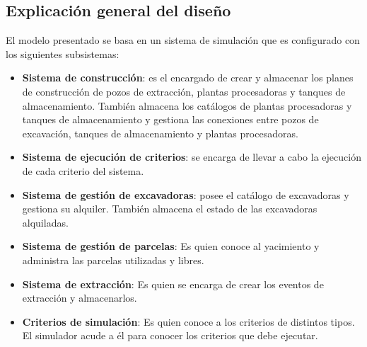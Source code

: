 \subsection{Explicación general del diseño}
\par El modelo presentado se basa en un sistema de simulación que es configurado con los siguientes subsistemas:
\begin{itemize}
  \item \textbf{Sistema de construcción}: es el encargado de crear y almacenar los planes de construcción de pozos de extracción, plantas procesadoras y tanques de almacenamiento. También almacena los catálogos de plantas procesadoras y tanques de almacenamiento y gestiona las conexiones entre pozos de excavación, tanques de almacenamiento y plantas procesadoras.
  \item \textbf{Sistema de ejecución de criterios}: se encarga de llevar a cabo la ejecución de cada criterio del sistema.
  \item \textbf{Sistema de gestión de excavadoras}: posee el catálogo de excavadoras y gestiona su alquiler. También almacena el estado de las excavadoras alquiladas.
  \item \textbf{Sistema de gestión de parcelas}: Es quien conoce al yacimiento y administra las parcelas utilizadas y libres.
  \item \textbf{Sistema de extracción}: Es quien se encarga de crear los eventos de extracción y almacenarlos.
  \item \textbf{Criterios de simulación}: Es quien conoce a los criterios de distintos tipos. El simulador acude a él para conocer los criterios que debe ejecutar.
\end{itemize}

